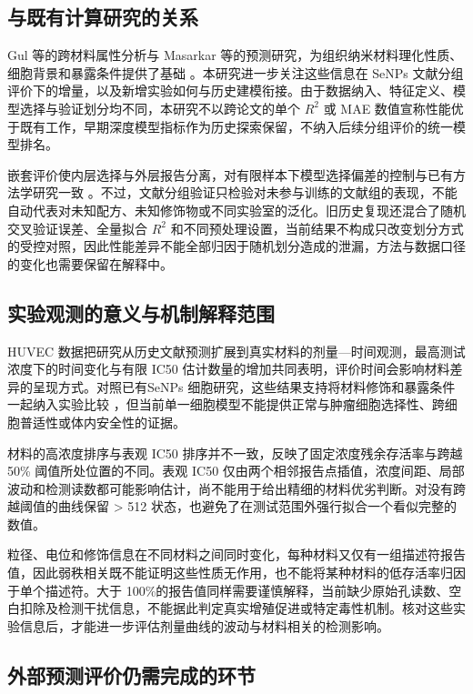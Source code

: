 \documentclass[letterpaper]{article}
\begin{document}
\subsection{与既有计算研究的关系}

Gul 等的跨材料属性分析与 Masarkar 等的预测研究，为组织纳米材料理化性质、细胞背景和暴露条件提供了基础 \cite{gul2021association,masarkar2024}。本研究进一步关注这些信息在 SeNPs 文献分组评价下的增量，以及新增实验如何与历史建模衔接。由于数据纳入、特征定义、模型选择与验证划分均不同，本研究不以跨论文的单个 $R^2$ 或 MAE 数值宣称性能优于既有工作，早期深度模型指标作为历史探索保留，不纳入后续分组评价的统一模型排名。

嵌套评价使内层选择与外层报告分离，对有限样本下模型选择偏差的控制与已有方法学研究一致 \cite{cawley2010selection}。不过，文献分组验证只检验对未参与训练的文献组的表现，不能自动代表对未知配方、未知修饰物或不同实验室的泛化。旧历史复现还混合了随机交叉验证误差、全量拟合 $R^2$ 和不同预处理设置，当前结果不构成只改变划分方式的受控对照，因此性能差异不能全部归因于随机划分造成的泄漏，方法与数据口径的变化也需要保留在解释中。

\subsection{实验观测的意义与机制解释范围}

HUVEC 数据把研究从历史文献预测扩展到真实材料的剂量—时间观测，最高测试浓度下的时间变化与有限 IC50 估计数量的增加共同表明，评价时间会影响材料差异的呈现方式。对照已有SeNPs 细胞研究，这些结果支持将材料修饰和暴露条件一起纳入实验比较 \cite{wang2020prooxidation,lunkov2023chitosan}，但当前单一细胞模型不能提供正常与肿瘤细胞选择性、跨细胞普适性或体内安全性的证据。

材料的高浓度排序与表观 IC50 排序并不一致，反映了固定浓度残余存活率与跨越 50\% 阈值所处位置的不同。表观 IC50 仅由两个相邻报告点插值，浓度间距、局部波动和检测读数都可能影响估计，尚不能用于给出精细的材料优劣判断。对没有跨越阈值的曲线保留 > 512 状态，也避免了在测试范围外强行拟合一个看似完整的数值。

粒径、电位和修饰信息在不同材料之间同时变化，每种材料又仅有一组描述符报告值，因此弱秩相关既不能证明这些性质无作用，也不能将某种材料的低存活率归因于单个描述符。大于 100\%的报告值同样需要谨慎解释，当前缺少原始孔读数、空白扣除及检测干扰信息，不能据此判定真实增殖促进或特定毒性机制。核对这些实验信息后，才能进一步评估剂量曲线的波动与材料相关的检测影响。

\subsection{外部预测评价仍需完成的环节}
\end{document}
